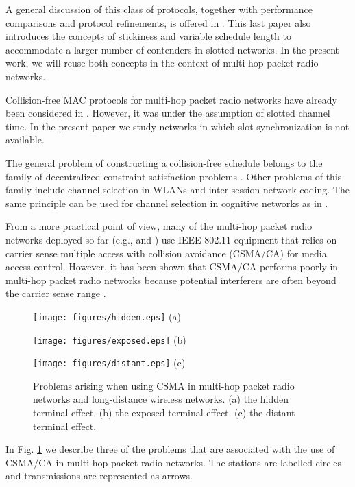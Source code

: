 \documentclass[twocolumn]{svjour3}          \smartqed  \usepackage{graphicx}
\begin{document}
A general discussion of this class of protocols, together with performance comparisons and protocol refinements, is offered in \cite{fang2010dlm}.
This last paper also introduces the concepts of stickiness and variable schedule length to accommodate a larger number of contenders in slotted networks.
In the present work, we will reuse both concepts in the context of multi-hop packet radio networks.

Collision-free MAC protocols for multi-hop packet radio networks have already been considered in \cite{hui2011epp}. 
However, it was under the assumption of slotted channel time.
In the present paper we study networks in which slot synchronization is not available.


The general problem of constructing a collision-free schedule belongs to the family of decentralized constraint satisfaction problems \cite{duffy2011dcs}.
Other problems of this family include channel selection in WLANs and inter-session network coding.
The same principle can be used for channel selection in  cognitive networks as in \cite{khan2011sod}.

From a more practical point of view, many of the multi-hop packet radio networks deployed so far (e.g., \cite{chambers2002grr} and \cite{oliver2010wca}) use IEEE 802.11 equipment that relies on carrier sense multiple access with collision avoidance (CSMA/CA)  for media access control.
However, it has been shown that CSMA/CA performs poorly in multi-hop packet radio networks because potential interferers are often beyond the carrier sense range \cite{gurewitz2009mmo}.

\begin{figure}[]
\centering
  \texttt{[image: figures/hidden.eps]}
(a)

\vspace{0.3in}
  \texttt{[image: figures/exposed.eps]}
(b)

\vspace{0.3in}
  \texttt{[image: figures/distant.eps]}
(c)
\caption{Problems arising when using CSMA in multi-hop packet radio networks and long-distance wireless networks. (a) the hidden terminal effect. (b) the exposed terminal effect. (c) the distant terminal effect.}
\label{fig:problems}
\end{figure}

In Fig. \ref{fig:problems} we describe three of the problems that are associated with the use of CSMA/CA in multi-hop packet radio networks.
The stations are labelled circles and transmissions are represented as arrows.
\end{document}
